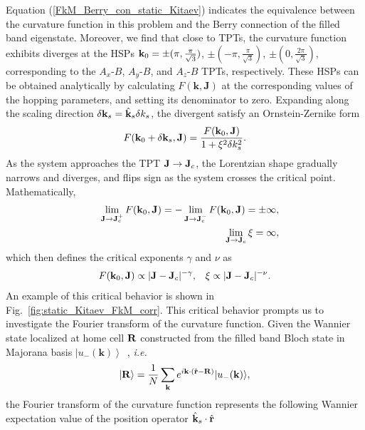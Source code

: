 \documentclass[aps,prb,twocolumn,superscriptaddress,groupedaddress]{revtex4}
\begin{document}
Equation (\ref{FkM_Berry_con_static_Kitaev}) indicates the equivalence between the curvature function in this problem and the Berry connection of the filled band eigenstate. 
Moreover, we find that close to TPTs, the curvature function exhibits diverges at the HSPs ${\bf k}_{0}= \pm (\pi, \frac{\pi}{\sqrt{3}})$, $\pm (-\pi, \frac{\pi}{\sqrt{3}})$, $\pm (0, \frac{2\pi}{\sqrt{3}})$, corresponding to the $A_x$-$B$,  $A_y$-$B$, and $A_z$-$B$ TPTs, respectively.
These HSPs can be obtained analytically by calculating $F(\mathbf{k}, \mathbf{J})$ at the corresponding values of the hopping parameters, and setting its denominator to zero.
Expanding along the scaling direction $\delta{\bf k}_{s}={\hat{\bf k}}_{s}\delta k_{s}$, the  divergent satisfy an Ornstein-Zernike form
%
\begin{eqnarray}
F({\bf k}_{0}+\delta {\bf k}_{s},{\bf J})=\frac{F({\bf k}_{0},{\bf J})}{1+\xi^{2}\delta k_{s}^{2}}.
\label{static_Ornstein_Zernike}
\end{eqnarray}
%
As the system approaches the TPT ${\bf J}\rightarrow{\bf J}_{c}$, the Lorentzian shape gradually narrows and diverges, and flips sign as the system crosses the critical point.
Mathematically,
%
\begin{eqnarray}
&&\lim_{{\bf J}\rightarrow{\bf J}_{c}^{+}}F({\bf k}_{0},{\bf J})=-\lim_{{\bf J}\rightarrow{\bf J}_{c}^{-}}F({\bf k}_{0},{\bf J})=\pm\infty,
\nonumber \\
&&\lim_{{\bf J}\rightarrow{\bf J}_{c}}\xi=\infty,
\label{Fk0_xi_divergence}
\end{eqnarray}
%
which then defines the  critical exponents  $\gamma$ and $\nu$ as
%
\begin{eqnarray}
F({\bf k}_{0},{\bf J})\propto|{\bf J}-{\bf J}_{c}|^{-\gamma},\;\;\;\xi\propto|{\bf J}-{\bf J}_{c}|^{-\nu}.
\label{Fk0_xi_exponent}
\end{eqnarray}
%
An example of this critical behavior is shown in Fig.~\ref{fig:static_Kitaev_FkM_corr}. 
This critical behavior prompts us to investigate the Fourier transform of the curvature function.
Given the Wannier state localized at home cell ${\bf R}$ constructed from the filled band Bloch state in Majorana basis $\left| u_-(\mathbf{k})\right>$~\cite{Molignini:2018}, \textit{i.e.}
%
\begin{eqnarray}
|{\bf R}\rangle=\frac{1}{N}\sum_{\bf k}e^{i{\bf k}\cdot({\hat{\bf r}}-{\bf R})}|u_{-}({\bf k})\rangle,
\label{Wannier_static}
\end{eqnarray}
%
the Fourier transform of the curvature function represents the  following Wannier expectation value of the position operator ${\hat{\bf k}}_{s}\cdot{\hat{\bf r}}$ 
\end{document}
